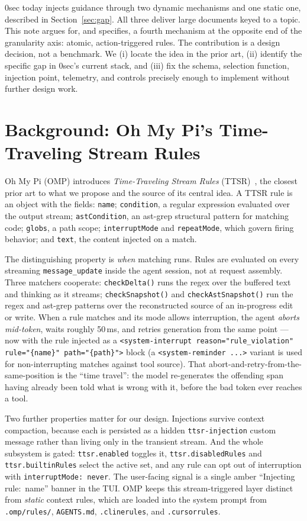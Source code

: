 \documentclass[11pt]{article}
\begin{document}
0sec today injects guidance through two dynamic mechanisms and one static one,
described in Section~\ref{sec:gap}. All three deliver large documents keyed to a
topic. This note argues for, and specifies, a fourth mechanism at the opposite
end of the granularity axis: atomic, action-triggered rules. The contribution
is a design decision, not a benchmark. We (i) locate the idea in the prior art,
(ii) identify the specific gap in 0sec's current stack, and (iii) fix the schema,
selection function, injection point, telemetry, and controls precisely enough to
implement without further design work.

\section{Background: Oh My Pi's Time-Traveling Stream Rules}
\label{sec:ttsr}

Oh My Pi (OMP) introduces \emph{Time-Traveling Stream Rules}
(TTSR)~\cite{omp,ompttsr,ompwiki}, the closest prior art to what we propose and
the source of its central idea. A TTSR rule is an object with the fields:
\texttt{name}; \texttt{condition}, a regular expression evaluated over the output
stream; \texttt{astCondition}, an ast-grep structural pattern for matching code;
\texttt{globs}, a path scope; \texttt{interruptMode} and \texttt{repeatMode},
which govern firing behavior; and \texttt{text}, the content injected on a match.

The distinguishing property is \emph{when} matching runs. Rules are evaluated on
every streaming \texttt{message\_update} inside the agent session, not at request
assembly. Three matchers cooperate: \texttt{checkDelta()} runs the regex over the
buffered text and thinking as it streams; \texttt{checkSnapshot()} and
\texttt{checkAstSnapshot()} run the regex and ast-grep patterns over the
reconstructed source of an in-progress edit or write. When a rule matches and its
mode allows interruption, the agent \emph{aborts mid-token}, waits roughly
50\,ms, and retries generation from the same point --- now with the rule injected
as a
\texttt{<system-interrupt reason="rule\_violation" rule="\{name\}" path="\{path\}">}
block (a \texttt{<system-reminder ...>} variant is used for non-interrupting
matches against tool source). That abort-and-retry-from-the-same-position is the
``time travel'': the model re-generates the offending span having already been
told what is wrong with it, before the bad token ever reaches a tool.

Two further properties matter for our design. Injections survive context
compaction, because each is persisted as a hidden \texttt{ttsr-injection} custom
message rather than living only in the transient stream. And the whole subsystem
is gated: \texttt{ttsr.enabled} toggles it, \texttt{ttsr.disabledRules} and
\texttt{ttsr.builtinRules} select the active set, and any rule can opt out of
interruption with \texttt{interruptMode: never}. The user-facing signal is a
single amber ``Injecting rule: \guillemotright{}\,name'' banner in the TUI. OMP
keeps this stream-triggered layer distinct from \emph{static} context rules,
which are loaded into the system prompt from \texttt{.omp/rules/},
\texttt{AGENTS.md}, \texttt{.clinerules}, and \texttt{.cursorrules}.
\end{document}
